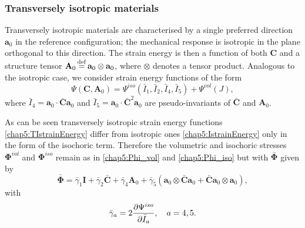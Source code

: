 	\subsubsection*{Transversely isotropic materials}
Transversely isotropic materials are characterised by a single preferred direction $\mathbf{a}_0$ in the reference configuration; the mechanical response is isotropic in the plane orthogonal to this direction. The strain energy is then a function of both $  \mathbf{C} $ and a structure tensor $\mathbf{A}_0 \, {\buildrel\rm	def\over=} \,  \mathbf{a}_0 \otimes \mathbf{a}_0$, where $\otimes$ denotes a tensor product. Analogous to the isotropic case, we consider strain energy functions of the form	
\begin{equation}
\label{chap5:TIstrainEnergy}
\Psi (\mathbf{C}, \mathbf{A}_0) = \Psi^{iso}(\bar{I}_1, \bar{I}_2, \bar{I}_4, \bar{I}_5) + \Psi^{vol}(J),
\end{equation}
where $ \bar{I}_4 = \mathbf{a}_0 \cdot \mathbf{\bar{C}} \mathbf{a}_0$ and $ \bar{I}_5 = \mathbf{a}_0 \cdot \mathbf{\bar{C}}^2 \mathbf{a}_0 $ are pseudo-invariants of $ \mathbf{\bar{C}} $ and $ \mathbf{A}_0 $. 

\bigskip

\noindent As can be seen transversely isotropic strain energy functions \eqref{chap5:TIstrainEnergy} differ from isotropic ones \eqref{chap5:IstrainEnergy} only in the form of the isochoric term. Therefore the volumetric and isochoric stresses $ \boldsymbol \Phi^{vol} $ and $ \boldsymbol \Phi^{iso} $ remain as in \eqref{chap5:Phi_vol} and \eqref{chap5:Phi_iso} but with $\bar{\boldsymbol \Phi} $ given by
\begin{equation}
\label{chap5:PhiBarTI}
\bar{\boldsymbol \Phi} = \bar{\gamma}_1 \mathbf{I} + \bar{\gamma}_2 \mathbf{\bar{C}} + \bar{\gamma}_4 \mathbf{A}_0 + \bar{\gamma}_5 ( \mathbf{a}_0 \otimes \mathbf{\bar{C}} \mathbf{a}_0 +  \mathbf{\bar{C}} \mathbf{a}_0 \otimes \mathbf{a}_0 ),
\end{equation}
with 
\begin{equation}
\bar{\gamma}_a = 2 \dfrac{\partial \Psi^{iso}}{\partial \bar{I}_a}, \quad a = 4, 5.
\end{equation}

	

